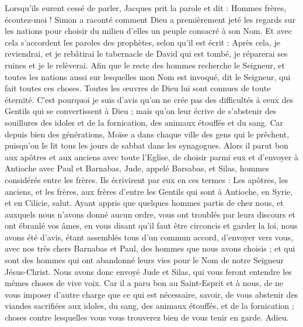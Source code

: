 \begin{multicols}{2}
Lorsqu'ils eurent cessé de parler, Jacques prit la parole et dit : Hommes frères, écoutez-moi !
Simon a raconté comment Dieu a premièrement jeté les regards sur les nations pour choisir du milieu d'elles un peuple consacré à son Nom. 
Et avec cela s'accordent les paroles des prophètes, selon qu'il est écrit :
Après cela, je reviendrai, et je rebâtirai le tabernacle de David qui est tombé, je réparerai ses ruines et je le relèverai.
Afin que le reste des hommes recherche le Seigneur, et toutes les nations aussi sur lesquelles mon Nom est invoqué, dit le Seigneur, qui fait toutes ces choses.
Toutes les œuvres de Dieu lui sont connues de toute éternité.
C'est pourquoi je suis d'avis qu'on ne crée pas des difficultés à ceux des Gentils qui se convertissent à Dieu ;
mais qu'on leur écrive de s'abstenir des souillures des idoles et de la fornication, des animaux étouffés et du sang.
Car depuis bien des générations, Moïse a dans chaque ville des gens qui le prêchent, puisqu'on le lit tous les jours de sabbat dans les synagogues.
Alors il parut bon aux apôtres et aux anciens avec toute l'Eglise, de choisir parmi eux et d'envoyer à Antioche avec Paul et Barnabas, Jude, appelé Barsabas, et Silas, hommes considérés entre les frères.
Ils écrivirent par eux en ces termes : Les apôtres, les anciens, et les frères, aux frères d'entre les Gentils qui sont à Antioche, en Syrie, et en Cilicie, salut.
Ayant appris que quelques hommes partis de chez nous, et auxquels nous n'avons donné aucun ordre, vous ont troublés par leurs discours et ont ébranlé vos âmes, en vous disant qu'il faut être circoncis et garder la loi,
nous avons été d'avis, étant assemblés tous d'un commun accord, d'envoyer vers vous, avec nos très chers Barnabas et Paul, des hommes que nous avons choisis ;
et qui sont des hommes qui ont abandonné leurs vies pour le Nom de notre Seigneur Jésus-Christ.
Nous avons donc envoyé Jude et Silas, qui vous feront entendre les mêmes choses de vive voix.
Car il a paru bon au Saint-Esprit et à nous, de ne vous imposer d'autre charge que ce qui est nécessaire,
savoir, de vous abstenir des viandes sacrifiées aux idoles, du sang, des animaux étouffés, et de la fornication ; choses contre lesquelles vous vous trouverez bien de vous tenir en garde. Adieu.

\end{multicols}
